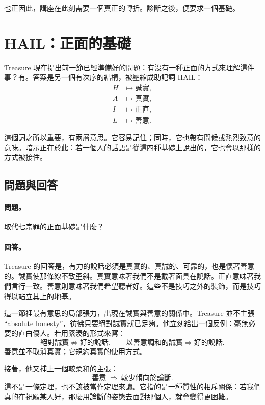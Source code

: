 也正因此，講座在此刻需要一個真正的轉折。診斷之後，便要求一個基礎。

\section{HAIL：正面的基礎}

Treasure 現在提出前一節已經準備好的問題：有沒有一種正面的方式來理解這件事？有。答案是另一個有次序的結構，被壓縮成助記詞 \(\mathrm{HAIL}\)：
\begin{align}
H &\mapsto \text{誠實},\\
A &\mapsto \text{真實},\\
I &\mapsto \text{正直},\\
L &\mapsto \text{善意}.
\end{align}

這個詞之所以重要，有兩層意思。它容易記住；同時，它也帶有問候或熱烈致意的意味。暗示正在於此：若一個人的話語是從這四種基礎上說出的，它也會以那樣的方式被接住。

\subsection{問題與回答}

\paragraph{問題。} 取代七宗罪的正面基礎是什麼？

\paragraph{回答。} Treasure 的回答是，有力的說話必須是真實的、真誠的、可靠的，也是懷著善意的。誠實使那條線不致歪斜。真實意味著我們不是戴著面具在說話。正直意味著我們言行一致。善意則意味著我們希望聽者好。這些不是技巧之外的裝飾，而是技巧得以站立其上的地基。

這一節裡最有意思的局部張力，出現在誠實與善意的關係中。Treasure 並不主張 ``absolute honesty''，彷彿只要絕對誠實就已足夠。他立刻給出一個反例：毫無必要的直白傷人。若用緊湊的形式來寫：
\begin{equation}
\text{絕對誠實} \not\Rightarrow \text{好的說話},
\qquad
\text{以善意調和的誠實} \Rightarrow \text{好的說話}.
\end{equation}
善意並不取消真實；它規約真實的使用方式。

接著，他又補上一個較柔和的主張：
\begin{equation}
\text{善意} \;\Rightarrow\; \text{較少傾向於論斷}.
\end{equation}
這不是一條定理，也不該被當作定理來讀。它指的是一種質性的相斥關係：若我們真的在祝願某人好，那麼用論斷的姿態去面對那個人，就會變得更困難。

